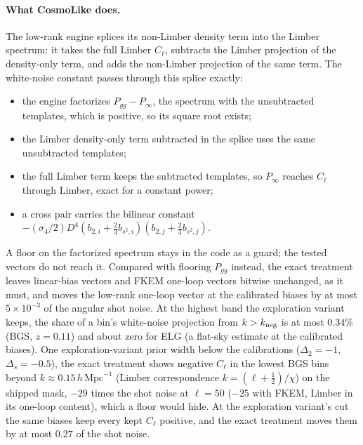 \documentclass[11pt]{article}
\newcommand{\hMpc}{\,h\,\mathrm{Mpc}^{-1}}
\begin{document}
\paragraph{What CosmoLike does.}
The low-rank engine splices its non-Limber density term into the
Limber spectrum: it takes the full Limber $C_\ell$, subtracts the
Limber projection of the density-only term, and adds the non-Limber
projection of the same term.  The white-noise constant passes through
this splice exactly:
\begin{itemize}
\item the engine factorizes $P_{gg} - P_\infty$, the spectrum with the
unsubtracted templates, which is positive, so its square root exists;
\item the Limber density-only term subtracted in the splice uses the
same unsubtracted templates;
\item the full Limber term keeps the subtracted templates, so
$P_\infty$ reaches $C_\ell$ through Limber, exact for a constant power;
\item a cross pair carries the bilinear constant
$-(\sigma_4/2)D^4(b_{2,i} + \tfrac{2}{3}b_{s^2,i})
(b_{2,j} + \tfrac{2}{3}b_{s^2,j})$.
\end{itemize}
A floor on the factorized spectrum stays in the code as a guard; the
tested vectors do not reach it.  Compared with flooring $P_{gg}$
instead, the exact treatment leaves linear-bias vectors and FKEM
one-loop vectors bitwise unchanged, as it must, and moves the low-rank
one-loop vector at the calibrated biases by at most $5\times10^{-3}$ of
the angular shot noise.  At the highest band the exploration variant
keeps, the share of a bin's white-noise projection from
$k > k_{\rm neg}$ is at most $0.34\%$ (BGS, $z = 0.11$) and about zero
for ELG (a flat-sky estimate at the calibrated biases).  One
exploration-variant
prior width below the calibrations ($\Delta_2 = -1$,
$\Delta_s = -0.5$), the exact treatment shows negative $C_\ell$ in the
lowest BGS bins beyond $k \approx 0.15\hMpc$ (Limber correspondence
$k = (\ell + \tfrac12)/\chi$) on the shipped mask, $-29$ times the shot
noise at $\ell = 50$ ($-25$ with FKEM, Limber in its one-loop content),
which a floor would hide.  At the exploration variant's cut the same
biases keep
every kept $C_\ell$ positive, and the exact treatment moves them by at
most $0.27$ of the shot noise.
\end{document}
